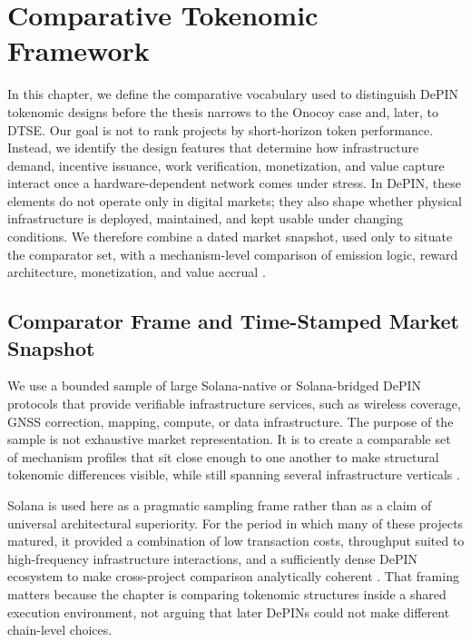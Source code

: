\section{Comparative Tokenomic Framework}
\label{sec:comparative_tokenomic_framework}

In this chapter, we define the comparative vocabulary used to distinguish DePIN tokenomic designs before the thesis narrows to the Onocoy case and, later, to DTSE. Our goal is not to rank projects by short-horizon token performance. Instead, we identify the design features that determine how infrastructure demand, incentive issuance, work verification, monetization, and value capture interact once a hardware-dependent network comes under stress. In DePIN, these elements do not operate only in digital markets; they also shape whether physical infrastructure is deployed, maintained, and kept usable under changing conditions. We therefore combine a dated market snapshot, used only to situate the comparator set, with a mechanism-level comparison of emission logic, reward architecture, monetization, and value accrual \cite{Ballandies2023, Lin2024, Morris2019, Braakman2022}.

\subsection{Comparator Frame and Time-Stamped Market Snapshot}
We use a bounded sample of large Solana-native or Solana-bridged DePIN protocols that provide verifiable infrastructure services, such as wireless coverage, GNSS correction, mapping, compute, or data infrastructure. The purpose of the sample is not exhaustive market representation. It is to create a comparable set of mechanism profiles that sit close enough to one another to make structural tokenomic differences visible, while still spanning several infrastructure verticals \cite{Messari2024, CoinMarketCapDePIN, Coincub2025}.

Solana is used here as a pragmatic sampling frame rather than as a claim of universal architectural superiority. For the period in which many of these projects matured, it provided a combination of low transaction costs, throughput suited to high-frequency infrastructure interactions, and a sufficiently dense DePIN ecosystem to make cross-project comparison analytically coherent \cite{Ballandies2023ChainSelection, Coincub2025, HeliumHIP70}. That framing matters because the chapter is comparing tokenomic structures inside a shared execution environment, not arguing that later DePINs could not make different chain-level choices.


